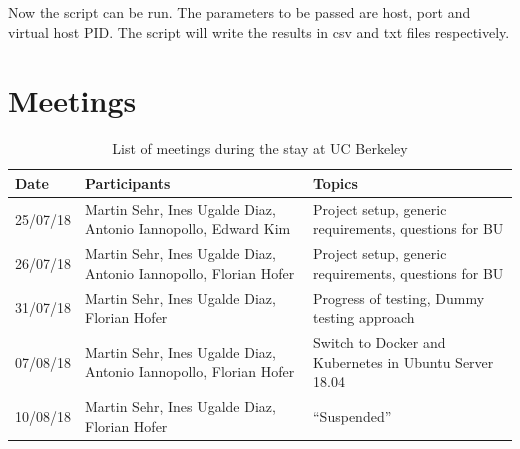 \documentclass[]{scrartcl}
\begin{document}
Now the script can be run. The parameters to be passed are host, port and virtual host PID. The script will write the results in csv and txt files respectively.

\section{Meetings}
\label{sec:meeting}

\begin{table}[H]
	\centering
	\caption{List of meetings during the stay at UC Berkeley}
	
	\begin{tabular}{l p{5cm} p{5cm}}
	Date & Participants & Topics \\
	\hline
	25/07/18 & Martin Sehr, Ines Ugalde Diaz, Antonio Iannopollo, Edward Kim & Project setup, generic requirements, questions for BU\\
	26/07/18 & Martin Sehr, Ines Ugalde Diaz, Antonio Iannopollo, Florian Hofer & Project setup, generic requirements, questions for BU\\
	31/07/18 & Martin Sehr, Ines Ugalde Diaz, Florian Hofer & Progress of testing, Dummy testing approach\\
	07/08/18 & Martin Sehr, Ines Ugalde Diaz, Antonio Iannopollo, Florian Hofer & Switch to Docker and Kubernetes in Ubuntu Server 18.04\\
	10/08/18 & Martin Sehr, Ines Ugalde Diaz, Florian Hofer & ``Suspended''\\
	\hline
	\end{tabular}
	
	\label{tab:meeting}
\end{table}



\end{document}
